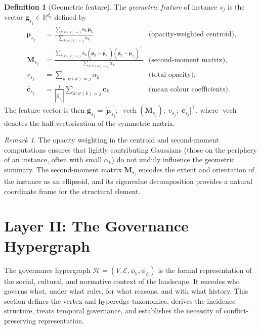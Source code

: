 \documentclass[11pt,a4paper]{article}
\theoremstyle{plain}
\theoremstyle{definition}
\newtheorem{definition}[theorem]{Definition}
\theoremstyle{remark}
\newtheorem{remark}[theorem]{Remark}
\newcommand{\vech}{\operatorname{vech}}
\newcommand{\GS}{\mathcal{G}}
\newcommand{\HG}{\mathcal{H}}
\newcommand{\inst}{\psi}
\newcommand{\gvec}{\mathbf{g}}
\begin{document}
\begin{definition}[Geometric feature]
\label{def:geom_feature}
The \emph{geometric feature} of instance $s_j$ is the vector
$\gvec_{s_j} \in \mathbb{R}^{d_g}$ defined by
\begin{align*}
  \bar{{\boldsymbol\mu}}_{s_j}
  &= \frac{\sum_{k : \inst(k)=j} \alpha_k\,{\boldsymbol\mu}_k}
          {\sum_{k : \inst(k)=j} \alpha_k}
  & \text{(opacity-weighted centroid)},\\
  \mathbf{M}_{s_j}
  &= \frac{\sum_{k : \inst(k)=j} \alpha_k
    ({\boldsymbol\mu}_k - \bar{{\boldsymbol\mu}}_{s_j})
    ({\boldsymbol\mu}_k - \bar{{\boldsymbol\mu}}_{s_j})^\top}
    {\sum_{k : \inst(k)=j} \alpha_k}
  & \text{(second-moment matrix)},\\
  v_{s_j}
  &= \sum_{k : \inst(k)=j} \alpha_k
  & \text{(total opacity)},\\
  \bar{\mathbf{c}}_{s_j}
  &= \frac{1}{|\GS_{s_j}|}\sum_{k : \inst(k)=j} \mathbf{c}_k
  & \text{(mean colour coefficients)}.
\end{align*}
The feature vector is then
$\gvec_{s_j} = \bigl[\bar{{\boldsymbol\mu}}_{s_j}^\top;\;
\vech(\mathbf{M}_{s_j});\; v_{s_j};\; \bar{\mathbf{c}}_{s_j}^\top\bigr]^\top$,
where $\vech$ denotes the half-vectorisation of the symmetric matrix.
\end{definition}

\begin{remark}
The opacity weighting in the centroid and second-moment computations
ensures that lightly contributing Gaussians (those on the periphery of
an instance, often with small $\alpha_k$) do not unduly influence the
geometric summary. The second-moment matrix $\mathbf{M}_{s_j}$ encodes
the extent and orientation of the instance as an ellipsoid, and its
eigenvalue decomposition provides a natural coordinate frame for the
structural element.
\end{remark}

\section{Layer II: The Governance Hypergraph}
\label{sec:layer2}

The governance hypergraph $\HG = (V, \mathcal{E}, \phi_V, \phi_E)$
is the formal representation of the social, cultural, and normative
context of the landscape. It encodes who governs what, under what rules,
for what reasons, and with what history. This section defines the vertex
and hyperedge taxonomies, derives the incidence structure, treats
temporal governance, and establishes the necessity of conflict-preserving
representation.
\end{document}
